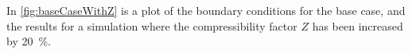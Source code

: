 

In \cref{fig:baseCaseWithZ} is a plot of the boundary conditions for the base case, and the results for a simulation where the compressibility factor $Z$ has been increased by \SI{20}{\percent}. 


